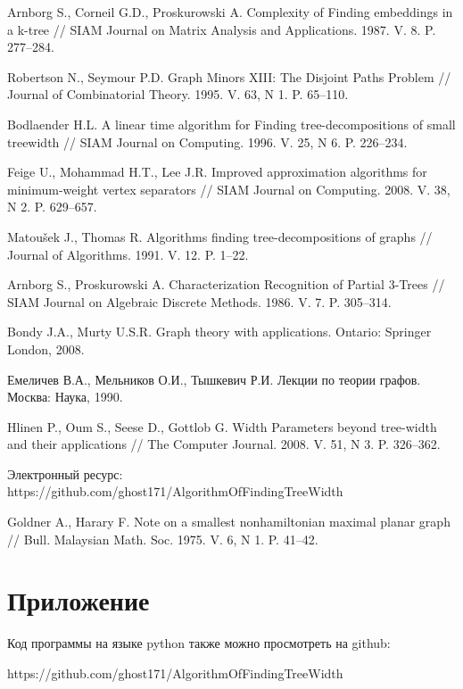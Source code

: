 \documentclass[a4paper,12pt]{article}
\begin{document}
\begin{large}
\begin{thebibliography}{100}
			 Arnborg S., Corneil G.D., Proskurowski A. Complexity of Finding embeddings in a k-tree // SIAM Journal on Matrix Analysis and Applications. 1987. V. 8. P. 277--284.

			 Robertson N., Seymour P.D. Graph Minors XIII: The Disjoint Paths Problem // Journal of Combinatorial Theory. 1995. V. 63, N 1. P. 65--110.

			 Bodlaender H.L. A linear time algorithm for Finding tree-decompositions of small treewidth // SIAM Journal on Computing. 1996. V. 25, N 6. P. 226--234.

			 Feige U., Mohammad H.T., Lee J.R. Improved approximation algorithms for minimum-weight vertex separators // SIAM Journal on Computing. 2008. V. 38, N 2. P. 629--657.

			 Matoušek J., Thomas R. Algorithms finding tree-decompositions of graphs // Journal of Algorithms. 1991. V. 12. P. 1--22.

			 Arnborg S., Proskurowski A. Characterization Recognition of Partial 3-Trees // SIAM Journal on Algebraic Discrete Methods. 1986. V. 7. P. 305--314.

			 Bondy J.A., Murty U.S.R. Graph theory with applications. Ontario: Springer London, 2008.

			 Емеличев В.А., Мельников О.И., Тышкевич Р.И. Лекции по теории графов. Москва: Наука, 1990.

			 Hlinen P., Oum S., Seese D., Gottlob G. Width Parameters beyond tree-width and their applications // The Computer Journal. 2008. V. 51, N 3. P. 326--362.

			 Электронный ресурс: https://github.com/ghost171/AlgorithmOfFindingTreeWidth

			 Goldner A., Harary F. Note on a smallest nonhamiltonian maximal planar graph // Bull. Malaysian Math. Soc. 1975. V. 6, N 1. P. 41--42.

		\end{thebibliography}
		
		\newpage
		\section{Приложение}
		\renewcommand{\baselinestretch}{1.5}

		Код программы на языке python также можно просмотреть на github: 
		
		https://github.com/ghost171/AlgorithmOfFindingTreeWidth


\end{large}
\end{document}
